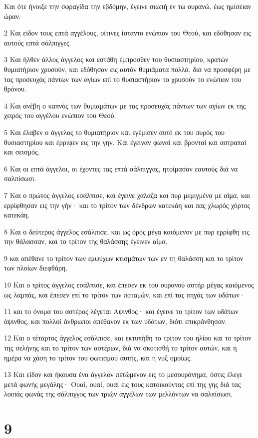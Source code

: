 \par Και ότε ήνοιξε την σφραγίδα την εβδόμην, έγεινε σιωπή εν τω ουρανώ, έως ημίσειαν ώραν.
\par 2 Και είδον τους επτά αγγέλους, οίτινες ίσταντο ενώπιον του Θεού, και εδόθησαν εις αυτούς επτά σάλπιγγες.
\par 3 Και ήλθεν άλλος άγγελος και εστάθη έμπροσθεν του θυσιαστηρίου, κρατών θυμιατήριον χρυσούν, και εδόθησαν εις αυτόν θυμιάματα πολλά, διά να προσφέρη με τας προσευχάς πάντων των αγίων επί το θυσιαστήριον το χρυσούν το ενώπιον του θρόνου.
\par 4 Και ανέβη ο καπνός των θυμιαμάτων με τας προσευχάς πάντων των αγίων εκ της χειρός του αγγέλου ενώπιον του Θεού.
\par 5 Και έλαβεν ο άγγελος το θυμιατήριον και εγέμισεν αυτό εκ του πυρός του θυσιαστηρίου και έρριψεν εις την γην. Και έγειναν φωναί και βρονταί και αστραπαί και σεισμός.
\par 6 Και οι επτά άγγελοι, οι έχοντες τας επτά σάλπιγγας, ητοίμασαν εαυτούς διά να σαλπίσωσι.
\par 7 Και ο πρώτος άγγελος εσάλπισε, και έγεινε χάλαζα και πυρ μεμιγμένα με αίμα, και ερρίφθησαν εις την γήν· και το τρίτον των δένδρων κατεκάη και πας χλωρός χόρτος κατεκάη.
\par 8 Και ο δεύτερος άγγελος εσάλπισε, και ως όρος μέγα καιόμενον με πυρ ερρίφθη εις την θάλασσαν, και το τρίτον της θαλάσσης έγεινεν αίμα,
\par 9 και απέθανε το τρίτον των εμψύχων κτισμάτων των εν τη θαλάσση και το τρίτον των πλοίων διεφθάρη.
\par 10 Και ο τρίτος άγγελος εσάλπισε, και έπεσεν εκ του ουρανού αστήρ μέγας καιόμενος ως λαμπάς, και έπεσεν επί το τρίτον των ποταμών, και επί τας πηγάς των υδάτων·
\par 11 και το όνομα του αστέρος λέγεται Αψινθος· και έγεινε το τρίτον των υδάτων άψινθος, και πολλοί άνθρωποι απέθανον εκ των υδάτων, διότι επικράνθησαν.
\par 12 Και ο τέταρτος άγγελος εσάλπισε, και εκτυπήθη το τρίτον του ηλίου και το τρίτον της σελήνης και το τρίτον των αστέρων, διά να σκοτισθή το τρίτον αυτών, και η ημέρα να χάση το τρίτον του φωτισμού αυτής, και η νυξ ομοίως.
\par 13 Και είδον και ήκουσα ένα άγγελον πετώμενον εις το μεσουράνημα, όστις έλεγε μετά φωνής μεγάλης· Ουαί, ουαί, ουαί εις τους κατοικούντας επί της γης διά τας λοιπάς φωνάς της σάλπιγγος των τριών αγγέλων των μελλόντων να σαλπίσωσι.

\chapter{9}

